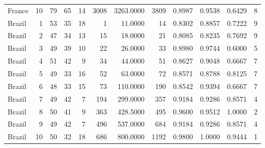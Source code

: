 \begin{tabular}{lrrrrrrrrrrr}
France & 10 & 79 & 65 & 14 & 3008 & 3263.0000 & 3809 & 0.8987 & 0.9538 & 0.6429 & 8 \\
Brazil & 1 & 53 & 35 & 18 & 1 & 11.0000 & 14 & 0.8302 & 0.8857 & 0.7222 & 9 \\
Brazil & 2 & 47 & 34 & 13 & 15 & 18.0000 & 21 & 0.8085 & 0.8235 & 0.7692 & 9 \\
Brazil & 3 & 49 & 39 & 10 & 22 & 26.0000 & 33 & 0.8980 & 0.9744 & 0.6000 & 5 \\
Brazil & 4 & 51 & 42 & 9 & 34 & 44.0000 & 51 & 0.8627 & 0.9048 & 0.6667 & 7 \\
Brazil & 5 & 49 & 33 & 16 & 52 & 63.0000 & 72 & 0.8571 & 0.8788 & 0.8125 & 7 \\
Brazil & 6 & 48 & 33 & 15 & 73 & 110.0000 & 190 & 0.8542 & 0.9394 & 0.6667 & 7 \\
Brazil & 7 & 49 & 42 & 7 & 194 & 299.0000 & 357 & 0.9184 & 0.9286 & 0.8571 & 4 \\
Brazil & 8 & 50 & 41 & 9 & 363 & 428.5000 & 495 & 0.9600 & 0.9512 & 1.0000 & 2 \\
Brazil & 9 & 49 & 42 & 7 & 496 & 537.0000 & 684 & 0.9184 & 0.9286 & 0.8571 & 4 \\
Brazil & 10 & 50 & 32 & 18 & 686 & 800.0000 & 1192 & 0.9800 & 1.0000 & 0.9444 & 1 \\
\bottomrule
\end{tabular}
